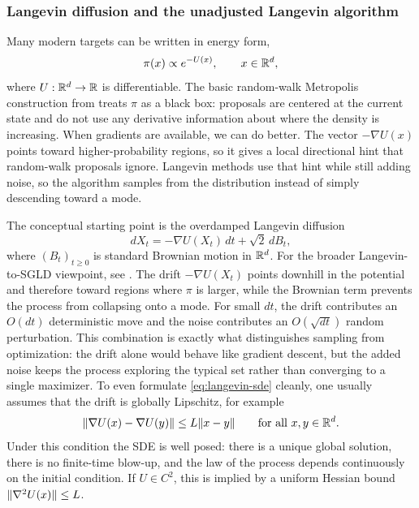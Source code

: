 \subsubsection{Langevin diffusion and the unadjusted Langevin algorithm}
\label{subsec:mcmc-gradient-based}
\label{subsubsec:langevin-diffusion}

Many modern targets can be written in energy form,
\[
  \pi(x) \propto e^{-U(x)},
  \qquad
  x\in\mathbb{R}^d,
\]
where $U:\mathbb{R}^d\to\mathbb{R}$ is differentiable.
The basic random-walk Metropolis construction from  treats \(\pi\) as a black box: proposals are centered at the current state and do not use any derivative information about where the density is increasing.
When gradients are available, we can do better.
The vector \(-\nabla U(x)\) points toward higher-probability regions, so it gives a local directional hint that random-walk proposals ignore.
Langevin methods use that hint while still adding noise, so the algorithm samples from the distribution instead of simply descending toward a mode.

The conceptual starting point is the overdamped Langevin diffusion
\begin{equation}
  dX_t = -\nabla U(X_t)\,dt + \sqrt{2}\,dB_t,
  \label{eq:langevin-sde}
\end{equation}
where $(B_t)_{t\ge 0}$ is standard Brownian motion in $\mathbb{R}^d$.
For the broader Langevin-to-SGLD viewpoint, see \citet[\S\S2--3]{welling_teh_2011_sgld}.
The drift $-\nabla U(X_t)$ points downhill in the potential and therefore toward regions where $\pi$ is larger, while the Brownian term prevents the process from collapsing onto a mode.
For small $dt$, the drift contributes an $O(dt)$ deterministic move and the noise contributes an $O(\sqrt{dt})$ random perturbation.
This combination is exactly what distinguishes sampling from optimization: the drift alone would behave like gradient descent, but the added noise keeps the process exploring the typical set rather than converging to a single maximizer.
To even formulate \eqref{eq:langevin-sde} cleanly, one usually assumes that the drift is globally Lipschitz, for example
\[
  \lVert\nabla U(x)-\nabla U(y)\rVert \le L\lVert x-y\rVert
  \qquad
  \text{for all }x,y\in\mathbb{R}^d.
\]
Under this condition the SDE is well posed: there is a unique global solution, there is no finite-time blow-up, and the law of the process depends continuously on the initial condition.
If $U\in C^2$, this is implied by a uniform Hessian bound $\lVert\nabla^2 U(x)\rVert\le L$.


